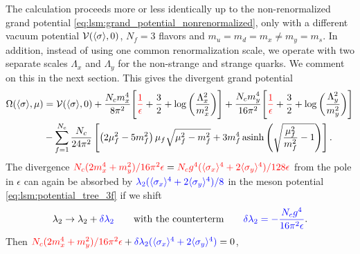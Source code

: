 The calculation proceeds more or less identically up to the non-renormalized grand potential \eqref{eq:lsm:grand_potential_nonrenormalized},
only with a different vacuum potential $\mathcal{V}(\langle \sigma \rangle,0)$, $N_f=3$ flavors and $m_u = m_d = m_x \neq m_y = m_s$.
In addition, instead of using one common renormalization scale,
we operate with two separate scales $\Lambda_x$ and $\Lambda_y$ for the non-strange and strange quarks.
We comment on this in the next section.
This gives the divergent grand potential
\begin{equation}
\begin{split}
	\Omega(\avg{\sigma},\mu) &= \pot(\avg{\sigma},0) + \frac{N_c m_x^4}{8 \pi^2} \Bigg[ \textcolor{red}{\frac{1}{\epsilon}} + \frac{3}{2} + \log\bigg(\frac{\Lambda_x^2}{m_x^2}\bigg) \Bigg] + \frac{N_c m_y^4}{16 \pi^2} \Bigg[ \textcolor{red}{\frac{1}{\epsilon}} + \frac{3}{2} + \log\bigg(\frac{\Lambda_y^2}{m_y^2}\bigg) \Bigg] \\ %
	                         &-\smashoperator{\sum_{f=1}^{N_c}} \frac{N_c}{24 \pi^2} \left[ \left( 2 \mu_f^2 - 5 m_f^2 \right) \mu_f \sqrt{\mu_f^2 - m_f^2} + 3 m_f^4 \asinh \left( \sqrt{\frac{\mu_{\smash{f}}^2}{m_f^2}-1} \right) \right]. \\
\end{split}
\end{equation}
The divergence $\textcolor{red}{N_c (2 m_x^4 + m_y^2) / 16 \pi^2 \epsilon} = \textcolor{red}{N_c g^4 (\langle \sigma_x \rangle^4 + 2\langle \sigma_y \rangle^4) / 128 \epsilon}$
from the pole in $\epsilon$
can again be absorbed by $\textcolor{blue}{\lambda_2 (\langle \sigma_x \rangle^4+2\langle \sigma_y \rangle^4)/8}$ 
in the meson potential \eqref{eq:lsm:potential_tree_3f} if we shift
\begin{equation}
	\lambda_2 \rightarrow \lambda_2 + \textcolor{blue}{\delta\lambda_2} \qquad \text{with the counterterm} \qquad \textcolor{blue}{\delta\lambda_2 = -\frac{N_c g^4}{16 \pi^2 \epsilon}}.
\end{equation}
Then $\textcolor{red}{N_c (2 m_x^4 + m_y^2) / 16 \pi^2 \epsilon} + \textcolor{blue}{\delta\lambda_2 (\langle \sigma_x \rangle^4+2\langle \sigma_y \rangle^4)} = 0$,
